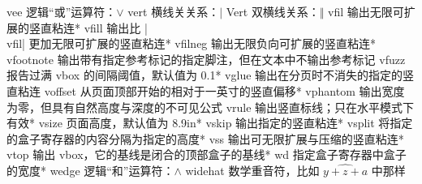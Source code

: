 \capcs vee {逻辑“或”运算符：$\vee$}{}{}
\capcs vert {横线关关系：$\vert$}{}{}
\capcs Vert {双横线关系：$\Vert$}{}{}
\capcs vfil {输出无限可扩展的竖直粘连}*{}
\capcs vfill {输出比 |\\vfil| 更加无限可扩展的竖直粘连}*{}
\capcs vfilneg {输出无限负向可扩展的竖直粘连}*{}
\capcs vfootnote {输出带有指定参考标记的指定脚注，但在文本中不输出参考标记}{}{}
\capcs vfuzz {报告过满 vbox 的间隔阈值，默认值为 0.1\pt}*{}
\capcs vglue {输出在分页时不消失的指定的竖直粘连}{}{}
\capcs voffset {从页面顶部开始的相对于一英寸的竖直偏移}*{}
\capcs vphantom {输出宽度为零，但具有自然高度与深度的不可见公式}{}{}
\capcs vrule {输出竖直标线；只在水平模式下有效}*{}
\capcs vsize {页面高度，默认值为 8.9\thinspace in}*{}
\capcs vskip {输出指定的竖直粘连}*{}
\capcs vsplit {将指定的盒子寄存器的内容分隔为指定的高度}*{}
\capcs vss {输出可无限扩展与压缩的竖直粘连}*{}
\capcs vtop {输出 vbox，它的基线是闭合的顶部盒子的基线}*{}
\capcs wd {指定盒子寄存器中盒子的宽度}*{}
\capcs wedge {逻辑“和”运算符：$\wedge$}{}{}
\capcs widehat {数学重音符，比如 $\widehat {y+z+a}$ 中那样}{}{}
